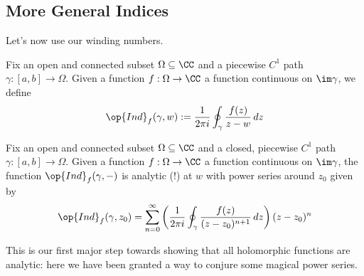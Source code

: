\subsection{More General Indices}
Let's now use our winding numbers.
\begin{definition}[Index]
	Fix an open and connected subset $\Omega\subseteq\CC$ and a piecewise $C^1$ path $\gamma:[a,b]\to\Omega$. Given a function $f:\Omega\to\CC$ a function continuous on $\im\gamma$, we define
	\[\op{Ind}_f(\gamma,w):=\frac1{2\pi i}\oint_\gamma\frac{f(z)}{z-w}\,dz\]
\end{definition}
\begin{proposition} \label{prop:indexanalytic}
	Fix an open and connected subset $\Omega\subseteq\CC$ and a closed, piecewise $C^1$ path $\gamma:[a,b]\to\Omega$. Given a function $f:\Omega\to\CC$ a function continuous on $\im\gamma$, the function $\op{Ind}_f(\gamma,-)$ is analytic (!) at $w$ with power series around $z_0$ given by
	\[\op{Ind}_f(\gamma,z_0)=\sum_{n=0}^\infty\left(\frac1{2\pi i}\oint_\gamma\frac{f(z)}{(z-z_0)^{n+1}}\,dz\right)(z-z_0)^n\]
\end{proposition}
This is our first major step towards showing that all holomorphic functions are analytic: here we have been granted a way to conjure some magical power series.

